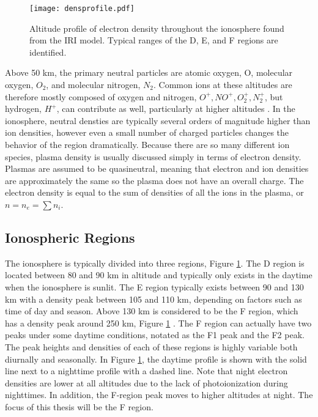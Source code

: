 \begin{figure}
	\texttt{[image: densprofile.pdf]}
	\caption{Altitude profile of electron density throughout the ionosphere found from the IRI model.  Typical ranges of the D, E, and F regions are identified.}
	\label{fig:densprofile}
\end{figure}

Above 50 km, the primary neutral particles are atomic oxygen, O, molecular oxygen, \(O_2\), and molecular nitrogen, \(N_2\).  Common ions at these altitudes are therefore mostly composed of oxygen and nitrogen, \(O^+, NO^+, O_2^+, N_2^+\), but hydrogen, \(H^+\), can contribute as well, particularly at higher altitudes \citep{Kelley2009}.  In the ionosphere, neutral densties are typically several orders of magnitude higher than ion densities, however even a small number of charged particles changes the behavior of the region dramatically.  Because there are so many different ion species, plasma density is usually discussed simply in terms of electron density.  Plasmas are assumed to be quasineutral, meaning that electron and ion densities are approximately the same so the plasma does not have an overall charge.  The electron density is equal to the sum of densities of all the ions in the plasma, or \(n = n_e = \sum n_i\).

\subsection{Ionospheric Regions}
\label{sec:ionosphere_regions}
The ionosphere is typically divided into three regions, Figure \ref{fig:densprofile}.  The D region is located between 80 and 90 km in altitude and typically only exists in the daytime when the ionosphere is sunlit.  The E region typically exists between 90 and 130 km with a density peak between 105 and 110 km, depending on factors such as time of day and season.  Above 130 km is considered to be the F region, which has a density peak around 250 km, Figure \ref{fig:densprofile} \citet{Luhmann1995}.  The F region can actually have two peaks under some daytime conditions, notated as the F1 peak and the F2 peak.  The peak heights and densities of each of these regions is highly variable both diurnally and seasonally.  In Figure \ref{fig:densprofile}, the daytime profile is shown with the solid line next to a nighttime profile with a dashed line.  Note that night electron densities are lower at all altitudes due to the lack of photoionization during nighttimes.  In addition, the F-region peak moves to higher altitudes at night.  The focus of this thesis will be the F region.

